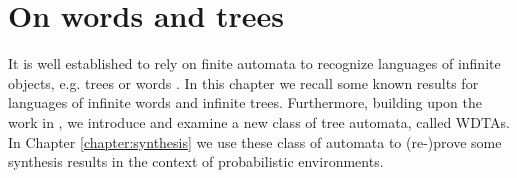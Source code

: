 \chapter{On words and trees}
It is well established to rely on finite automata to recognize languages of
infinite objects, e.g. trees or words \cite{LangAutoLog}. In this chapter we
recall some known results for languages of infinite words and infinite trees.
Furthermore, building upon the work in \cite{RandAutoInfTrees}, we introduce
and examine a new class of tree automata, called \aclp{WDTA}. In Chapter
\ref{chapter:synthesis} we use these class of automata to (re-)prove some
synthesis results in the context of probabilistic environments.








